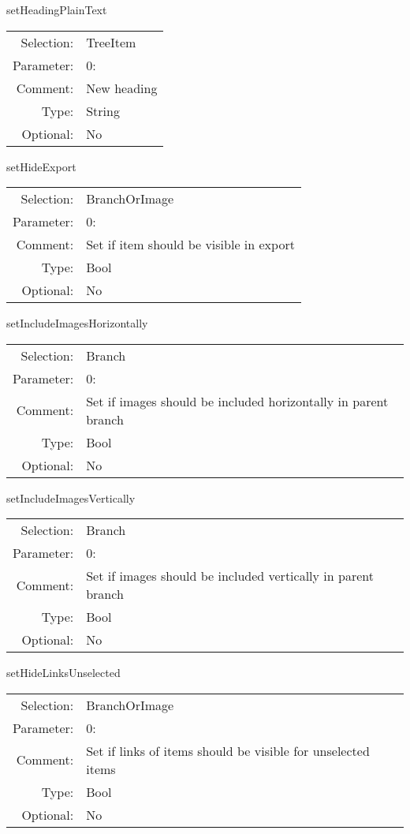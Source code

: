 \item setHeadingPlainText\\
\begin{tabular}{rl}
  Selection: & TreeItem\\
   Parameter: &  0:\\
        Comment: & New heading\\
           Type: & String\\
       Optional: &  No\\
\end{tabular}

\item setHideExport\\
\begin{tabular}{rl}
  Selection: & BranchOrImage\\
   Parameter: &  0:\\
        Comment: & Set if item should be visible in export\\
           Type: & Bool\\
       Optional: &  No\\
\end{tabular}

\item setIncludeImagesHorizontally\\
\begin{tabular}{rl}
  Selection: & Branch\\
   Parameter: &  0:\\
        Comment: & Set if images should be included horizontally in parent branch\\
           Type: & Bool\\
       Optional: &  No\\
\end{tabular}

\item setIncludeImagesVertically\\
\begin{tabular}{rl}
  Selection: & Branch\\
   Parameter: &  0:\\
        Comment: & Set if images should be included vertically in parent branch\\
           Type: & Bool\\
       Optional: &  No\\
\end{tabular}

\item setHideLinksUnselected\\
\begin{tabular}{rl}
  Selection: & BranchOrImage\\
   Parameter: &  0:\\
        Comment: & Set if links of items should be visible for unselected items\\
           Type: & Bool\\
       Optional: &  No\\
\end{tabular}

